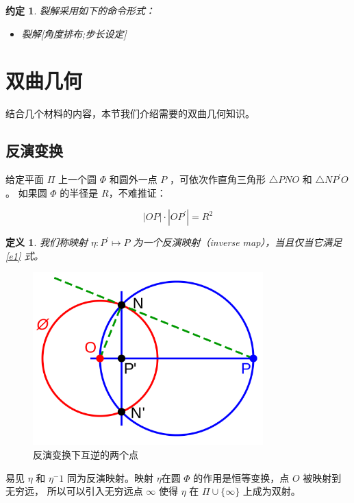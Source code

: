 \documentclass[a4paper,12pt]{article}
\newtheorem{definition}{定义}
\newtheorem{convention}{约定}
\begin{document}
\begin{convention}
裂解采用如下的命令形式：
\begin{itemize}
\item 裂解[角度排布;步长设定]
\end{itemize}
\end{convention}

\newpage

\section{双曲几何}

结合几个材料的内容，本节我们介绍需要的双曲几何知识。

\subsection{反演变换}

给定平面 $\Pi$ 上一个圆 $\Phi$ 和圆外一点 $P$ ，可依次作直角三角形 $\bigtriangleup P N O$ 和 $\bigtriangleup N P^\prime O$ 。
如果圆 $\Phi$ 的半径是 $R$，不难推证：

\begin{equation} \label{e1}
|OP| \cdot |OP^\prime| = R^2
\end{equation}

\begin{definition}
\label{d1}
我们称映射 $\eta: P^\prime \mapsto P$ 为一个反演映射（inverse map），当且仅当它满足 \ref{e1} 式。
\end{definition}

\begin{figure}[ht]
\centering
\includegraphics[width=3.5in]{images/inversion_in_circle.png}
\caption{反演变换下互逆的两个点}
\end{figure}

易见 $\eta$ 和 $\eta^-1$ 同为反演映射。映射 $\eta$在圆 $\Phi$ 的作用是恒等变换，点 $O$ 被映射到无穷远，
所以可以引入无穷远点 $\infty$ 使得 $\eta$ 在 $\Pi \cup \{\infty\}$ 上成为双射。
\end{document}
